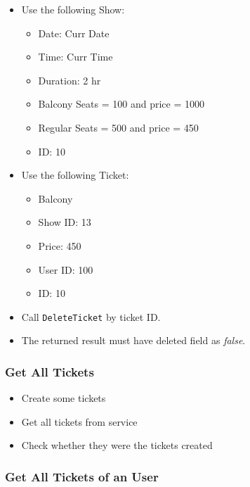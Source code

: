 \documentclass[]{article}
\providecommand{\tightlist}{%
  \setlength{\itemsep}{0pt}\setlength{\parskip}{0pt}}
\begin{document}
\begin{itemize}
\tightlist
\item
  Use the following Show:

  \begin{itemize}
  \tightlist
  \item
    Date: Curr Date
  \item
    Time: Curr Time
  \item
    Duration: 2 hr
  \item
    Balcony Seats = 100 and price = 1000
  \item
    Regular Seats = 500 and price = 450
  \item
    ID: 10
  \end{itemize}
\item
  Use the following Ticket:

  \begin{itemize}
  \tightlist
  \item
    Balcony
  \item
    Show ID: 13
  \item
    Price: 450
  \item
    User ID: 100
  \item
    ID: 10
  \end{itemize}
\item
  Call \texttt{DeleteTicket} by ticket ID.
\item
  The returned result must have deleted field as \emph{false}.
\end{itemize}

\hypertarget{get-all-tickets}{%
\subsubsection{Get All Tickets}\label{get-all-tickets}}

\begin{itemize}
\tightlist
\item
  Create some tickets
\item
  Get all tickets from service
\item
  Check whether they were the tickets created
\end{itemize}

\hypertarget{get-all-tickets-of-an-user}{%
\subsubsection{Get All Tickets of an
User}\label{get-all-tickets-of-an-user}}
\end{document}
